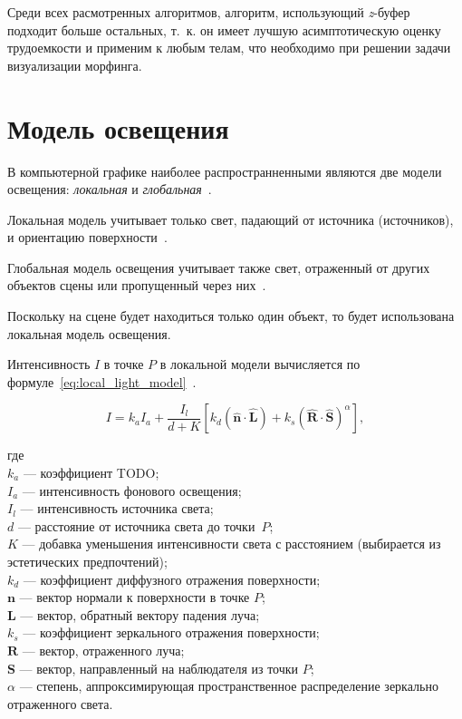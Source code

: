 	Среди всех расмотренных алгоритмов, алгоритм, использующий \textit{z}-буфер подходит больше остальных, т.~к. он имеет лучшую асимптотическую оценку трудоемкости и применим к любым телам, что необходимо при решении задачи визуализации морфинга.
    
    \section{Модель освещения}
    
    В компьютерной графике наиболее распространненными являются две модели освещения: \textit{локальная} и \textit{глобальная}~\cite{rogers}.
    
    Локальная модель учитывает только свет, падающий от источника (источников), и ориентацию поверхности~\cite{rogers}.
    
    Глобальная модель освещения учитывает также свет, отраженный от других объектов сцены или пропущенный через них~\cite{rogers}.
    
    Поскольку на сцене будет находиться только один объект, то будет использована локальная модель освещения.
    
    Интенсивность $I$ в точке $P$ в локальной модели вычисляется по формуле~\eqref{eq:local_light_model}~\cite{rogers}.
    
    \begin{equation}
    	\label{eq:local_light_model}
    	I = k_aI_a + \frac{I_l}{d + K}[k_d(\mathbf{\hat{n}\cdot \hat{L}})+k_s(\mathbf{\hat{R}\cdot \hat{S}})^\alpha],
    \end{equation}
    
    где \\
    $k_a$ --- коэффициент TODO; \\
    $I_a$ --- интенсивность фонового освещения; \\
    $I_l$ --- интенсивность источника света; \\
    $d$ --- расстояние от источника света до точки~$P$; \\
    $K$ --- добавка уменьшения интенсивности света с расстоянием (выбирается из эстетических предпочтений); \\
    $k_d$ --- коэффициент диффузного отражения поверхности; \\
    $\mathbf{n}$ --- вектор нормали к поверхности в точке $P$; \\
    $\mathbf{L}$ --- вектор, обратный вектору падения луча; \\
    $k_s$ --- коэффициент зеркального отражения поверхности; \\
    $\mathbf{R}$ --- вектор, отраженного луча; \\
    $\mathbf{S}$ --- вектор, направленный на наблюдателя из точки $P$; \\
    $\alpha$ --- степень, аппроксимирующая пространственное распределение зеркально отраженного света.
        

